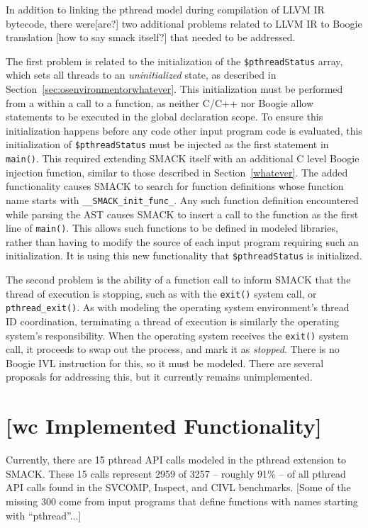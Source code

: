 In addition to linking the pthread model during compilation of LLVM IR
bytecode, there were[are?] two additional problems related to LLVM IR
to Boogie translation [how to say smack itself?] that needed to be
addressed.

The first problem is related to the initialization of the
\lstinline|$pthreadStatus| array, which sets all threads to an
\emph{uninitialized} state, as described in
Section~\ref{sec:osenvironmentorwhatever}.  This initialization must
be performed from a within a call to a function, as neither C/C++ nor
Boogie allow statements to be executed in the global declaration
scope.  To ensure this initialization happens before any code other
input program code is evaluated, this initialization of
\lstinline|$pthreadStatus| must be injected as the first statement in
\lstinline|main()|.  This required extending SMACK itself with an
additional C level Boogie injection function, similar to those
described in Section~\ref{whatever}.  The added functionality causes
SMACK to search for function definitions whose function name starts
with \lstinline|__SMACK_init_func_|.  Any such function definition
encountered while parsing the AST causes SMACK to insert a call to the
function as the first line of \lstinline|main()|.  This allows such
functions to be defined in modeled libraries, rather than having to
modify the source of each input program requiring such an
initialization.  It is using this new functionality that
\lstinline|$pthreadStatus| is initialized.

The second problem is the ability of a function call to inform SMACK
that the thread of execution is stopping, such as with the
\lstinline|exit()| system call, or \lstinline|pthread_exit()|.  As
with modeling the operating system environment's thread ID coordination,
terminating a thread of execution is similarly the operating system's
responsibility.  When the operating system receives the
\lstinline|exit()| system call, it proceeds to swap out the process,
and mark it as \emph{stopped}.  There is no Boogie IVL instruction for
this, so it must be modeled.  There are several proposals for
addressing this, but it currently remains unimplemented.

\section{[wc Implemented Functionality]}
Currently, there are 15 pthread API calls modeled in the pthread
extension to SMACK.  These 15 calls represent 2959 of 3257 -- roughly
91\% -- of all pthread API calls found in the SVCOMP, Inspect, and
CIVL benchmarks. [Some of the missing 300 come from input programs
that define functions with names starting with ``pthread''...]

